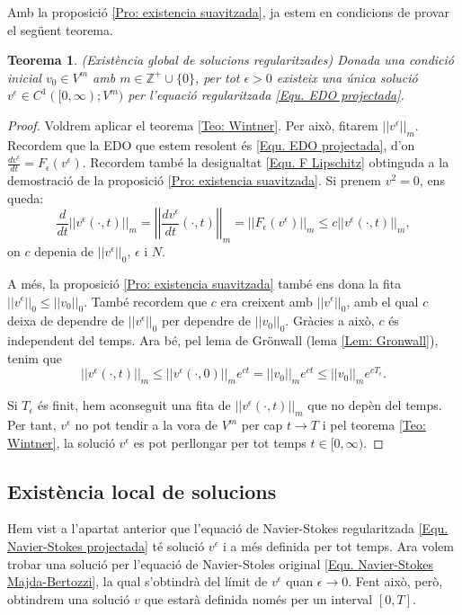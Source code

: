 \documentclass{article}
\numberwithin{equation}{section}
\newtheorem{teorema}{Teorema}[section]
\begin{document}
Amb la proposici\'{o} \ref{Pro: existencia suavitzada}, ja estem en condicions de provar el seg\"{u}ent teorema.

\begin{teorema}
(Exist\`{e}ncia global de solucions regularitzades) Donada una condici\'{o} inicial $v_0\in V^m$ amb $m\in\mathbb{Z}^+\cup\{0\}$, per tot $\epsilon>0$ existeix una \'{u}nica soluci\'{o} $v^{\epsilon}\in C^1([0,\infty);V^m)$ per l'equaci\'{o} regularitzada \eqref{Equ. EDO projectada}.
\end{teorema}
\begin{proof}
Voldrem aplicar el teorema \ref{Teo: Wintner}. Per aix\`{o}, fitarem $||v^{\epsilon}||_m$. Recordem que la EDO que estem resolent \'{e}s \eqref{Equ. EDO projectada}, d'on $\frac{dv^{\epsilon}}{dt}=F_{\epsilon}(v^{\epsilon})$. Recordem tamb\'{e} la desigualtat \eqref{Equ. F Lipschitz} obtinguda a la demostraci\'{o} de la proposici\'{o} \ref{Pro: existencia suavitzada}. Si prenem $v^2=0$, ens queda:
\[\frac{d}{dt}||v^{\epsilon}(\cdot,t)||_m=\left|\left|\frac{dv^{\epsilon}}{dt}(\cdot,t)\right|\right|_m=||F_{\epsilon}(v^{\epsilon})||_m\leq c||v^{\epsilon}(\cdot,t)||_m,\]
on $c$ depenia de $||v^{\epsilon}||_0$, $\epsilon$ i $N$.

A m\'{e}s, la proposici\'{o} \ref{Pro: existencia suavitzada} tamb\'{e} ens dona la fita $||v^{\epsilon}||_0\leq||v_0||_0$. Tamb\'{e} recordem que $c$ era creixent amb $||v^{\epsilon}||_0$, amb el qual $c$ deixa de dependre de $||v^{\epsilon}||_0$ per dependre de $||v_0||_0$. Gr\`{a}cies a aix\`{o}, $c$ \'{e}s independent del temps. Ara b\'{e}, pel lema de Gr\"{o}nwall (lema \ref{Lem: Gronwall}), tenim que
\[||v^{\epsilon}(\cdot,t)||_m\leq||v^{\epsilon}(\cdot,0)||_me^{ct}=||v_0||_me^{ct}\leq||v_0||_me^{cT_{\epsilon}}.\]

Si $T_{\epsilon}$ \'{e}s finit, hem aconseguit una fita de $||v^{\epsilon}(\cdot,t)||_m$ que no dep\`{e}n del temps. Per tant, $v^{\epsilon}$ no pot tendir a la vora de $V^m$ per cap $t\to T$ i pel teorema \ref{Teo: Wintner}, la soluci\'{o} $v^{\epsilon}$ es pot perllongar per tot temps $t\in[0,\infty)$.
\end{proof}

\subsection{Exist\`{e}ncia local de solucions}

Hem vist a l'apartat anterior que l'equaci\'{o} de Navier-Stokes regularitzada \eqref{Equ. Navier-Stokes projectada} t\'{e} soluci\'{o} $v^{\epsilon}$ i a m\'{e}s definida per tot temps. Ara volem trobar una soluci\'{o} per l'equaci\'{o} de Navier-Stoles original \eqref{Equ. Navier-Stokes Majda-Bertozzi}, la qual s'obtindr\`{a} del l\'{i}mit de $v^{\epsilon}$ quan $\epsilon\to0$. Fent aix\`{o}, per\`{o}, obtindrem una soluci\'{o} $v$ que estar\`{a} definida nom\'{e}s per un interval $[0,T]$.
\end{document}
